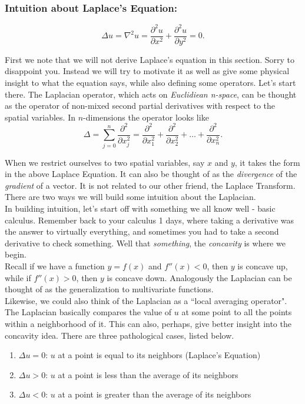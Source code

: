 \subsubsection{Intuition about Laplace's Equation:}
$$\Delta u = \nabla^2 u = \frac{\partial^2 u}{\partial x^2} + \frac{\partial^2 u}{\partial y^2} = 0.$$

First we note that we will not derive Laplace's equation in this section. Sorry to disappoint you. Instead we will try to motivate it as well as give some physical insight to what the equation says, while also defining some operators. Let's start there. The Laplacian operator, which acts on \emph{Euclidiean n-space}, can be thought as the operator of non-mixed second partial derivatives with respect to the spatial variables. In $n$-dimensions the operator looks like 
\begin{equation}
\label{Laplacian} \Delta = \sum_{j=0}^{n} \frac{\partial ^2 }{\partial x_j^2} = \frac{\partial ^2 }{\partial x_1^2}  + \frac{\partial ^2 }{\partial x_2^2} +\ldots + \frac{\partial ^2 }{\partial x_n^2}.
\end{equation}

When we restrict ourselves to two spatial variables, say $x$ and $y$, it takes the form in the above Laplace Equation. It can also be thought of as the \emph{divergence} of the \emph{gradient} of a vector. It is not related to our other friend, the Laplace Transform. There are two ways we will build some intuition about the Laplacian. \\

In building intuition, let's start off with something we all know well - basic calculus. Remember back to your calculus 1 days, where taking a derivative was the answer to virtually everything, and sometimes you had to take a second derivative to check something. Well that \emph{something}, the \emph{concavity} is where we begin. \\

Recall if we have a function $y=f(x)$ and $f''(x)<0$, then $y$ is concave up, while if $f''(x)>0$, then $y$ is concave down. Analogously the Laplacian can be thought of as the generalization to multivariate functions.\\

Likewise, we could also think of the Laplacian as a ``local averaging operator". The Laplacian basically compares the value of $u$ at some point to all the points within a neighborhood of it. This can also, perhaps, give better insight into the concavity idea. There are three pathological cases, listed below. 
\begin{enumerate}
\item $\Delta u=0$: $u$ at a point is equal to its neighbors (Laplace's Equation)
\item $\Delta u>0$: $u$ at a point is less than the average of its neighbors
\item $\Delta u<0$: $u$ at a point is greater than the average of its neighbors
\end{enumerate}

